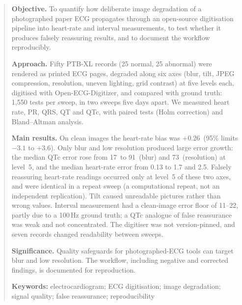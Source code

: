 \begin{abstract}
\noindent\textbf{Objective.} To quantify how deliberate image degradation of a photographed paper ECG propagates through an open-source digitisation pipeline into heart-rate and interval measurements, to test whether it produces falsely reassuring results, and to document the workflow reproducibly.

\noindent\textbf{Approach.} Fifty PTB-XL records (25 normal, 25 abnormal) were rendered as printed ECG pages, degraded along six axes (blur, tilt, JPEG compression, resolution, uneven lighting, grid contrast) at five levels each, digitised with Open-ECG-Digitizer, and compared with ground truth: 1{,}550 tests per sweep, in two sweeps five days apart. We measured heart rate, PR, QRS, QT and QTc, with paired tests (Holm correction) and Bland--Altman analysis.

\noindent\textbf{Main results.} On clean images the heart-rate bias was $+0.26$\bpm\ (95\% limits $-3.1$ to $+3.6$). Only blur and low resolution produced large error growth: the median QTc error rose from 17\ms\ to 91\ms\ (blur) and 73\ms\ (resolution) at level~5, and the median heart-rate error from 0.13 to 1.7 and 2.5\bpm. Falsely reassuring heart-rate readings occurred only at level~5 of these two axes, and were identical in a repeat sweep (a computational repeat, not an independent replication). Tilt caused unreadable pictures rather than wrong values. Interval measurement had a clean-image error floor of 11--22\ms, partly due to a 100\,Hz ground truth; a QTc analogue of false reassurance was weak and not concentrated. The digitiser was not version-pinned, and seven records changed readability between sweeps.

\noindent\textbf{Significance.} Quality safeguards for photographed-ECG tools can target blur and low resolution. The workflow, including negative and corrected findings, is documented for reproduction.

\medskip
\noindent\textbf{Keywords:} electrocardiogram; ECG digitisation; image degradation; signal quality; false reassurance; reproducibility
\end{abstract}

